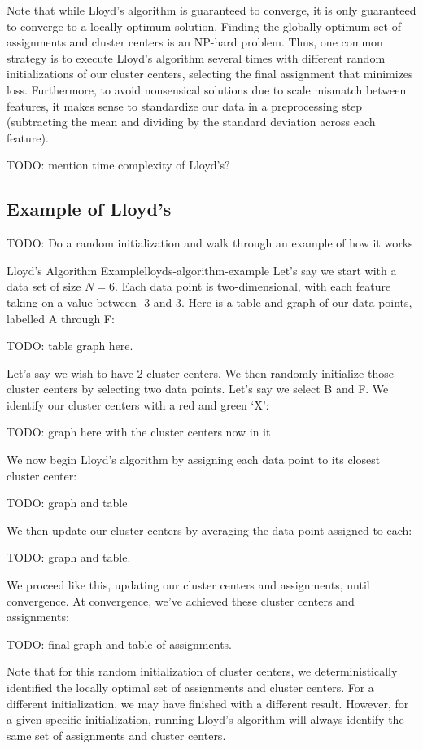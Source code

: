 Note that while Lloyd's algorithm is guaranteed to converge, it is only guaranteed to converge to a locally optimum solution. Finding the globally optimum set of assignments and cluster centers is an NP-hard problem. Thus, one common strategy is to execute Lloyd's algorithm several times with different random initializations of our cluster centers, selecting the final assignment that minimizes loss. Furthermore, to avoid nonsensical solutions due to scale mismatch between features, it makes sense to standardize our data in a preprocessing step (subtracting the mean and dividing by the standard deviation across each feature).

TODO: mention time complexity of Lloyd's?

\subsection{Example of Lloyd's}
TODO: Do a random initialization and walk through an example of how it works

\begin{example}{Lloyd's Algorithm Example}{lloyds-algorithm-example}
	Let's say we start with a data set of size $N=6$. Each data point is two-dimensional, with each feature taking on a value between -3 and 3. Here is a table and graph of our data points, labelled A through F:

	TODO: table graph here.

	Let's say we wish to have 2 cluster centers. We then randomly initialize those cluster centers by selecting two data points. Let's say we select B and F. We identify our cluster centers with a red and green `X':

	TODO: graph here with the cluster centers now in it

	We now begin Lloyd's algorithm by assigning each data point to its closest cluster center:

	TODO: graph and table

	We then update our cluster centers by averaging the data point assigned to each:

	TODO: graph and table.

	We proceed like this, updating our cluster centers and assignments, until convergence. At convergence, we've achieved these cluster centers and assignments:

	TODO: final graph and table of assignments.

	Note that for this random initialization of cluster centers, we deterministically identified the locally optimal set of assignments and cluster centers. For a different initialization, we may have finished with a different result. However, for a given specific initialization, running Lloyd's algorithm will always identify the same set of assignments and cluster centers.
\end{example}

